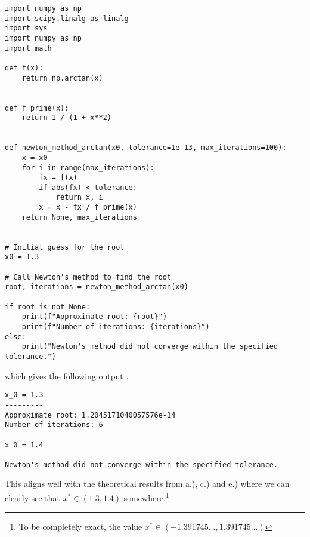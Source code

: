 \documentclass[12pt,
               a4paper,
               article,
               oneside,
               norsk,oldfontcommands]{memoir}
\begin{document}
\begin{lstlisting}
import numpy as np
import scipy.linalg as linalg
import sys
import numpy as np
import math

def f(x):
    return np.arctan(x)


def f_prime(x):
    return 1 / (1 + x**2)


def newton_method_arctan(x0, tolerance=1e-13, max_iterations=100):
    x = x0
    for i in range(max_iterations):
        fx = f(x)
        if abs(fx) < tolerance:
            return x, i
        x = x - fx / f_prime(x)
    return None, max_iterations


# Initial guess for the root
x0 = 1.3

# Call Newton's method to find the root
root, iterations = newton_method_arctan(x0)

if root is not None:
    print(f"Approximate root: {root}")
    print(f"Number of iterations: {iterations}")
else:
    print("Newton's method did not converge within the specified tolerance.")
\end{lstlisting}
which gives the following output .
\begin{verbatim}
x_0 = 1.3
---------
Approximate root: 1.2045171040057576e-14
Number of iterations: 6

x_0 = 1.4
---------
Newton's method did not converge within the specified tolerance.
\end{verbatim}
This aligns well with the theoretical results from a.), c.) and e.) where we can clearly see that $x^{*} \in (1.3, 1.4)$ somewhere.\footnote{To be completely exact, the value $x^{*} \in (-1.391745..., 1.391745...)$}
\end{document}
